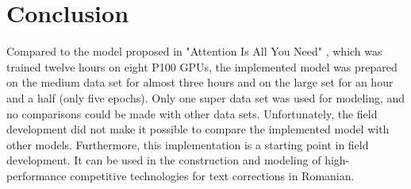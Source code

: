 \documentclass{article}
\begin{document}
    \section{Conclusion}
        
        Compared to the model proposed in "Attention Is All You Need" \cite{vaswani2017attention}, which was trained twelve hours on eight P100 GPUs, the implemented model was prepared on the medium data set for almost three hours and on the large set for an hour and a half (only five epochs). Only one super data set was used for modeling, and no comparisons could be made with other data sets. Unfortunately, the field development did not make it possible to compare the implemented model with other models. Furthermore, this implementation is a starting point in field development. It can be used in the construction and modeling of high-performance competitive technologies for text corrections in Romanian.
        
    
    
\end{document}

